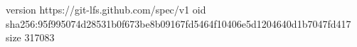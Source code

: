 version https://git-lfs.github.com/spec/v1
oid sha256:95f995074d28531b0f673be8b09167fd5464f10406e5d1204640d1b7047fd417
size 317083
